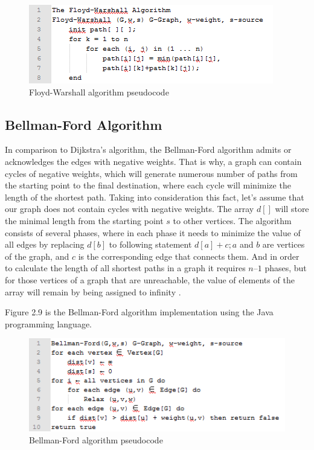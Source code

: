 \begin{figure}[h!]
	\centering
	\includegraphics[scale=1]{figure7.png}
	\caption{Floyd-Warshall algorithm pseudocode}
	\label{fig:figure7}
\end{figure}
\vspace{40mm}
\subsection{Bellman-Ford Algorithm}
In comparison to Dijkstra’s algorithm, the Bellman-Ford algorithm admits or acknowledges the edges with negative weights. That is why, a graph can contain cycles of negative weights, which will generate numerous number of paths from the starting point to the final destination, where each cycle will minimize the length of the shortest path. Taking into consideration this fact, let’s assume that our graph does not contain cycles with negative weights. The array $d[]$ will store the minimal length from the starting point $s$ to other vertices. The algorithm consists of several phases, where in each phase it needs to minimize the value of all edges by replacing $d[b]$ to following statement $d[a] + c; a$ and $b$ are vertices of the graph, and $c$ is the corresponding edge that connects them. And in order to calculate the length of all shortest paths in a graph it requires $n – 1$ phases, but for those vertices of a graph that are unreachable, the value of elements of the array will remain by being assigned to infinity \cite{magzhan2013review}.

Figure 2.9 is the Bellman-Ford algorithm implementation using the Java programming language.
 
\begin{figure}[h!]
	\centering
	\includegraphics[scale=1]{figure8.png}
	\caption{Bellman-Ford algorithm pseudocode}
	\label{fig:figure8}
\end{figure}

